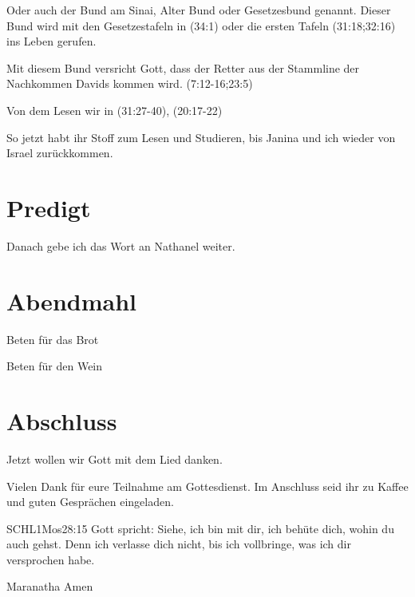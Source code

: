 \documentclass{mybib}
\begin{document}
\begin{spacing}{1.5}
\begin{block}
        Oder auch der Bund am Sinai, Alter Bund oder Gesetzesbund genannt. Dieser Bund wird mit den Gesetzestafeln in (34:1) oder die ersten Tafeln (31:18;32:16) ins Leben gerufen.
    \end{block}
    \begin{block}
        Mit diesem Bund versricht Gott, dass der Retter aus der Stammline der Nachkommen Davids kommen wird. (7:12-16;23:5)
    \end{block}
    \begin{block}
        Von dem Lesen wir in (31:27-40), (20:17-22)
    \end{block}
    So jetzt habt ihr Stoff zum Lesen und Studieren, bis Janina und ich wieder von Israel zurückkommen.
\end{spacing}
\section{Predigt}

Danach gebe ich das Wort an Nathanel weiter.



\section{Abendmahl}

Beten für das Brot


Beten für den Wein


\section{Abschluss}

Jetzt wollen wir Gott mit dem Lied  danken.

Vielen Dank für eure Teilnahme am Gottesdienst. Im Anschluss seid ihr zu Kaffee und guten Gesprächen eingeladen.
\beten{}

\begin{bibelbox}{SCHL}{1Mos}{28:15}
Gott spricht: Siehe, ich bin mit dir,
ich behüte dich, wohin du auch gehst.
Denn ich verlasse dich nicht,
bis ich vollbringe, was ich dir versprochen habe.
\end{bibelbox}

Maranatha Amen
\end{document}
